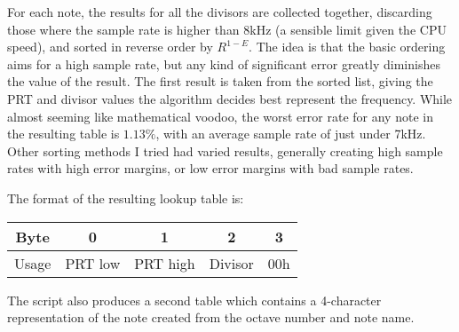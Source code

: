 For each note, the results for all the divisors are collected together, discarding those where the 
sample rate is higher than 8kHz (a sensible limit given the CPU speed), and sorted in reverse order 
by $R^{1-E}$.  The idea is that the basic ordering aims for a high sample rate, but any kind of 
significant error greatly diminishes the value of the result.  The first result is taken from the 
sorted list, giving the PRT and divisor values the algorithm decides best represent the frequency.  
While almost seeming like mathematical voodoo, the worst error rate for any note in the resulting 
table is $1.13\%$, with an average sample rate of just under 7kHz.  Other sorting methods I tried 
had varied results, generally creating high sample rates with high error margins, or low error 
margins with bad sample rates.

The format of the resulting lookup table is:
\begin{center}
\begin{tabular}{c | c | c | c | c}
Byte & 0 & 1 & 2 & 3 \\
\hline
Usage & PRT low & PRT high & Divisor & 00h \\
\end{tabular}
\end{center}

The script also produces a second table which contains a 4-character representation of the note 
created from the octave number and note name.
